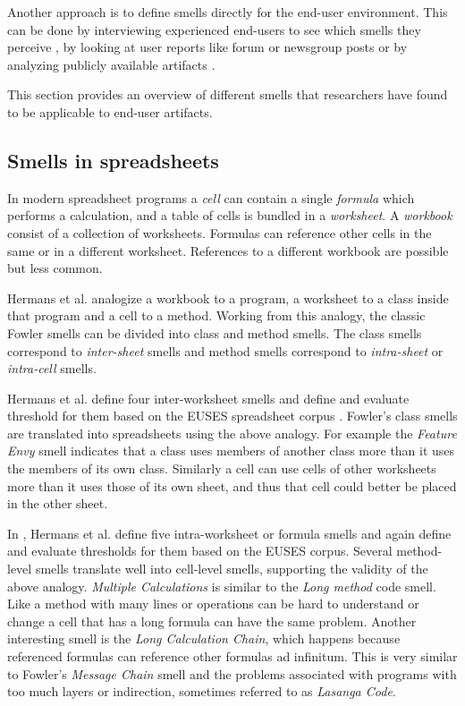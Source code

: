\documentclass[10pt,conference,compsocconf]{IEEEtran}
\begin{document}
Another approach is to define smells directly for the end-user environment.
This can be done by interviewing experienced end-users to see which smells they perceive \cite{chambers2013smell}, by looking at user reports like forum or newsgroup posts or by analyzing publicly available artifacts \cite{Stolee2011}.

This section provides an overview of different smells that researchers have found to be applicable to end-user artifacts.

\subsection{Smells in spreadsheets}

In modern spreadsheet programs a \textit{cell} can contain a single \textit{formula} which performs a calculation, and a table of cells is bundled in a \textit{worksheet}.
A \textit{workbook} consist of a collection of worksheets.
Formulas can reference other cells in the same or in a different worksheet.
References to a different workbook are possible but less common.
 
Hermans et al. \cite{Hermans2012inter} \cite{Hermans2012intra} analogize a workbook to a program, a worksheet to a class inside that program and a cell to a method.
Working from this analogy, the classic Fowler smells can be divided into class and method smells.
The class smells correspond to \textit{inter-sheet} smells and method smells correspond to \textit{intra-sheet} or \textit{intra-cell} smells.

Hermans et al. \cite{Hermans2012inter} define four inter-worksheet smells and define and evaluate threshold for them based on the EUSES spreadsheet corpus \cite{fisher2005euses}.
Fowler's class smells are translated into spreadsheets using the above analogy. 
For example the \textit{Feature Envy} smell indicates that a class uses members of another class more than it uses the members of its own class.
Similarly a cell can use cells of other worksheets more than it uses those of its own sheet, and thus that cell could better be placed in the other sheet.

In \cite{Hermans2012intra}, Hermans et al. define five intra-worksheet or formula smells and again define and evaluate thresholds for them based on the EUSES corpus.
Several method-level smells translate well into cell-level smells, supporting the validity of the above analogy.
\textit{Multiple Calculations} is similar to the \textit{Long method} code smell. Like a method with many lines or operations can be hard to understand or change a cell that has a long formula can have the same problem.
Another interesting smell is the \textit{Long Calculation Chain}, which happens because referenced formulas can reference other formulas ad infinitum.
This is very similar to Fowler's \textit{Message Chain} smell and the problems associated with programs with too much layers or indirection, sometimes referred to as \textit{Lasanga Code}.
\end{document}
